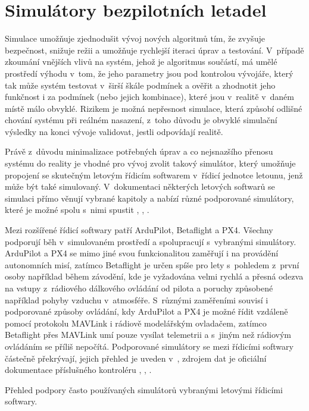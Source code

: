 \chapter{Simulátory bezpilotních letadel} \label{chap:sims}
    Simulace umožňuje zjednodušit vývoj nových algoritmů tím, že zvyšuje bezpečnost, snižuje režii a umožňuje rychlejší iteraci úprav a testování. V~případě zkoumání vnějších vlivů na systém, jehož je algoritmus součástí, má umělé prostředí výhodu v~tom, že jeho parametry jsou pod kontrolou vývojáře, který tak může systém testovat v~širší škále podmínek a ověřit a zhodnotit jeho funkčnost i za podmínek (nebo jejich kombinace), které jsou v~realitě v~daném místě málo obvyklé. Rizikem je možná nepřesnost simulace, která způsobí odlišné chování systému při reálném nasazení, z~toho důvodu je obvyklé simulační výsledky na konci vývoje validovat, jestli odpovídají realitě.

    Právě z~důvodu minimalizace potřebných úprav a co nejsnazšího přenosu systému do reality je vhodné pro vývoj zvolit takový simulátor, který umožňuje propojení se skutečným letovým řídicím softwarem v~řídicí jednotce letounu, jenž může být také simulovaný. V~dokumentaci některých letových softwarů se simulaci přímo věnují vybrané kapitoly a nabízí různé podporované simulátory, které je možné spolu s~nimi spustit \cite{px4:simulation}, \cite{ardupilot:simulation}, \cite{betaflight:simulation}.

    Mezi rozšířené řídicí softwary patří ArduPilot, Betaflight a PX4. Všechny podporují běh v~simulovaném prostředí a spolupracují s~vybranými simulátory. ArduPilot a PX4 se mimo jiné svou funkcionalitou zaměřují i na provádění autonomních misí, zatímco Betaflight je určen spíše pro lety s~pohledem z~první osoby například během závodění, kde je vyžadována velmi rychlá a přesná odezva na vstupy z~rádiového dálkového ovládání od pilota a poruchy způsobené například pohyby vzduchu v~atmosféře. S~různými zaměřeními souvisí i podporované způsoby ovládání, kdy ArduPilot a PX4 je možné řídit vzdáleně pomocí protokolu MAVLink i rádiově modelářským ovladačem, zatímco Betaflight přes MAVLink umí pouze vysílat telemetrii a s~jiným než rádiovým ovládáním se příliš nepočítá. Podporované simulátory se mezi řídicími softwary částečně překrývají, jejich přehled je uveden v~, zdrojem dat je oficiální dokumentace příslušného kontroléru \cite{px4:simulation}, \cite{ardupilot:simulation}, \cite{betaflight:simulation}.

    \begin{table}
        \centering
        
        \caption[Simulátory podporované kontrolérem letounu]{Přehled podpory často používaných simulátorů vybranými letovými řídicími softwary.}
        \label{tab:sims}
    \end{table}

